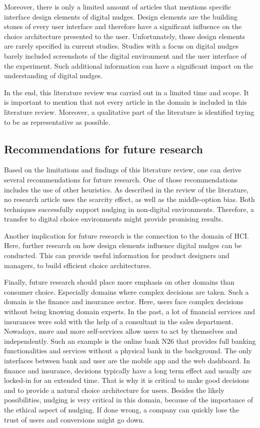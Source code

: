 Moreover, there is only a limited amount of articles that mentions specific interface design elements of digital nudges. Design elements are the building stones of every user interface and therefore have a significant influence on the choice architecture presented to the user. Unfortunately, those design elements are rarely specified in current studies. Studies with a focus on digital nudges barely included screenshots of the digital environment and the user interface of the experiment. Such additional information can have a significant impact on the understanding of digital nudges.

In the end, this literature review was carried out in a limited time and scope. It is important to mention that not every article in the domain is included in this literature review. Moreover, a qualitative part of the literature is identified trying to be as representative as possible.
 
 \subsection{Recommendations for future research}
 
 Based on the limitations and findings of this literature review, one can derive several recommendations for future research.
 One of those recommendations includes the use of other heuristics. As described in the review of the literature, no research article uses the scarcity effect, as well as the middle-option bias. Both techniques successfully support nudging in non-digital environments. Therefore, a transfer to digital choice environments might provide promising results.
 
 Another implication for future research is the connection to the domain of HCI. Here, further research on how design elements influence digital nudges can be conducted. This can provide useful information for product designers and managers, to build efficient choice architectures. 
 
 Finally, future research should place more emphasis on other domains than consumer choice. Especially domains where complex decisions are taken. Such a domain is the finance and insurance sector. Here, users face complex decisions without being knowing domain experts. In the past, a lot of financial services and insurances were sold with the help of a consultant in the sales department. Nowadays, more and more self-services allow users to act by themselves and independently. %
 Such an example is the online bank N26 that provides full banking functionalities and services without a physical bank in the background. The only interfaces between bank and user are the mobile app and the web dashboard. In finance and insurance, decisions typically have a long term effect and usually are locked-in for an extended time. That is why it is critical to make good decisions and to provide a natural choice architecture for users. Besides the likely possibilities, nudging is very critical in this domain, because of the importance of the ethical aspect of nudging. If done wrong, a company can quickly lose the trust of users and conversions might go down. 